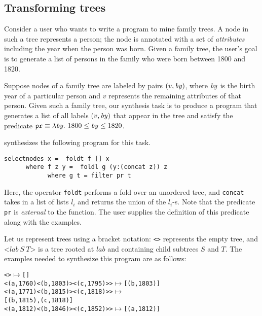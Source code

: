 \subsection{Transforming trees}


Consider a user who wants to write a program to mine family trees. A
node in such a tree represents a person; the node is annotated with a
set of {\em attributes} including the year when the person was
born. Given a family tree, the user's goal is to generate  a
list of persons in the family who were born between 1800 and 1820.

Suppose nodes of a family tree are labeled by pairs
$(v, \mathit{by})$, where $\mathit{by}$ is the birth year of a particular person  and $v$ represents the remaining attributes of that
person. Given such a family tree, our synthesis task is to produce a program that
generates a list of all labels $(v, \mathit{by})$ that appear in the
tree and satisfy the predicate ${\tt pr} \equiv \lambda \mathit{by}.\ 1800
\le \mathit{by} \le 1820$.

\sys synthesizes the following program for this task.
\begin{lstlisting}
selectnodes x =  foldt f [] x
      where f z y =  foldl g (y:(concat z)) z
            where g t = filter pr t
\end{lstlisting}
Here, the operator \verb+foldt+ performs a fold over an unordered
tree, and \verb+concat+ takes in a list of lists $l_i$ and returns the
union of the $l_i$-s.  Note that the predicate {\tt pr} is {\em external} to
the function. The user supplies the definition of this predicate along
with the examples. 


Let us represent trees using a bracket notation: \verb+<>+ represents
the empty tree, and $\texttt{<}\mathit{lab}~S~T\texttt{>}$ is a tree
rooted at $\mathit{lab}$ and containing  child
subtrees $S$ and $T$. The examples needed to synthesize this program are as follows: 

{\small
\begin{alltt}
<> \(\mapsto\) [] 
<(a,1760) <(b,1803)> <(c,1795)>> \(\mapsto\) [(b,1803)]
<(a,1771) <(b,1815)> <(c,1818)>> \(\mapsto\) 
                   [(b,1815), (c,1818)]
<(a,1812) <(b,1846)> <(c,1852)>> \(\mapsto\) [(a,1812)]
\end{alltt}
}

